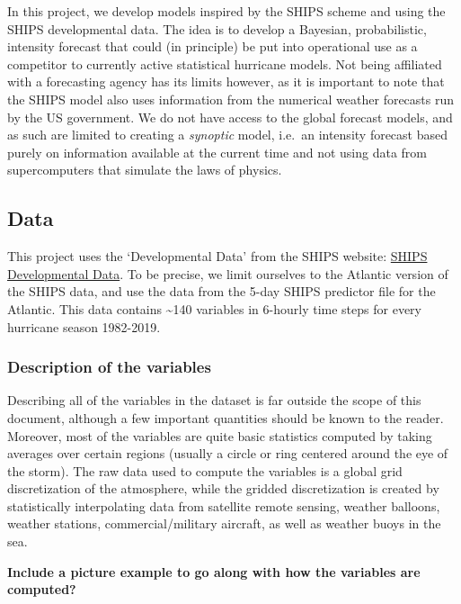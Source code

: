\documentclass[
]{article}
\begin{document}
In this project, we develop models inspired by the SHIPS scheme and
using the SHIPS developmental data. The idea is to develop a Bayesian,
probabilistic, intensity forecast that could (in principle) be put into
operational use as a competitor to currently active statistical
hurricane models. Not being affiliated with a forecasting agency has its
limits however, as it is important to note that the SHIPS model also
uses information from the numerical weather forecasts run by the US
government. We do not have access to the global forecast models, and as
such are limited to creating a \emph{synoptic} model, i.e.~an intensity
forecast based purely on information available at the current time and
not using data from supercomputers that simulate the laws of physics.

\hypertarget{data}{%
\subsection{Data}\label{data}}

This project uses the `Developmental Data' from the SHIPS website:
\href{http://rammb.cira.colostate.edu/research/tropical_cyclones/ships/developmental_data.asp}{SHIPS
Developmental Data}. To be precise, we limit ourselves to the Atlantic
version of the SHIPS data, and use the data from the 5-day SHIPS
predictor file for the Atlantic. This data contains \textasciitilde140
variables in 6-hourly time steps for every hurricane season 1982-2019.

\hypertarget{description-of-the-variables}{%
\subsubsection{Description of the
variables}\label{description-of-the-variables}}

Describing all of the variables in the dataset is far outside the scope
of this document, although a few important quantities should be known to
the reader. Moreover, most of the variables are quite basic statistics
computed by taking averages over certain regions (usually a circle or
ring centered around the eye of the storm). The raw data used to compute
the variables is a global grid discretization of the atmosphere, while
the gridded discretization is created by statistically interpolating
data from satellite remote sensing, weather balloons, weather stations,
commercial/military aircraft, as well as weather buoys in the sea.

\textbf{Include a picture example to go along with how the variables are
computed?}
\end{document}

